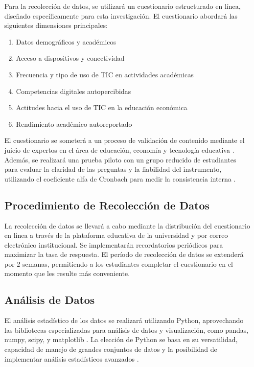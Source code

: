 \documentclass[12pt, a4paper]{article}
\begin{document}
Para la recolección de datos, se utilizará un cuestionario estructurado en línea, diseñado específicamente para esta investigación. El cuestionario abordará las siguientes dimensiones principales:

\begin{enumerate}
    \item Datos demográficos y académicos
    \item Acceso a dispositivos y conectividad
    \item Frecuencia y tipo de uso de TIC en actividades académicas
    \item Competencias digitales autopercibidas
    \item Actitudes hacia el uso de TIC en la educación económica
    \item Rendimiento académico autoreportado
\end{enumerate}

El cuestionario se someterá a un proceso de validación de contenido mediante el juicio de expertos en el área de educación, economía y tecnología educativa \parencite{Lawshe1975}. Además, se realizará una prueba piloto con un grupo reducido de estudiantes para evaluar la claridad de las preguntas y la fiabilidad del instrumento, utilizando el coeficiente alfa de Cronbach para medir la consistencia interna \parencite{Cronbach1951}.

\subsection{Procedimiento de Recolección de Datos}

La recolección de datos se llevará a cabo mediante la distribución del cuestionario en línea a través de la plataforma educativa de la universidad y por correo electrónico institucional. Se implementarán recordatorios periódicos para maximizar la tasa de respuesta. El período de recolección de datos se extenderá por 2 semanas, permitiendo a los estudiantes completar el cuestionario en el momento que les resulte más conveniente.

\subsection{Análisis de Datos}

El análisis estadístico de los datos se realizará utilizando Python, aprovechando las bibliotecas especializadas para análisis de datos y visualización, como pandas, numpy, scipy, y matplotlib \parencite{McKinney2017}. La elección de Python se basa en su versatilidad, capacidad de manejo de grandes conjuntos de datos y la posibilidad de implementar análisis estadísticos avanzados \parencite{VanderPlas2016}.
\end{document}
